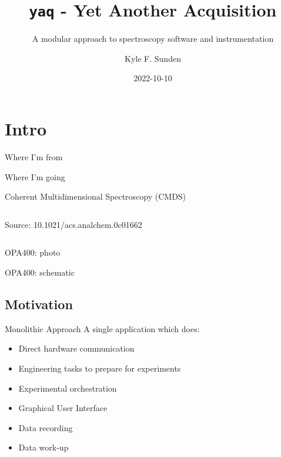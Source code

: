 \documentclass{presentation}
\title{\texttt{yaq} - Yet Another Acquisition}
\subtitle{A modular approach to spectroscopy software and instrumentation}
\author{Kyle F. Sunden}
\institute{University of Wisconsin--Madison}
\date{2022-10-10}
\begin{document}
\maketitle
\section{Intro}
\begin{frame}{Where I'm from}
\end{frame}
\begin{frame}{Where I'm going}
\end{frame}
\begin{frame}{Coherent Multidimensional Spectroscopy (CMDS)}
	\begin{columns}
		\begin{column}{0.48\textwidth}
			Source: 10.1021/acs.analchem.0c01662
		\end{column}
		\begin{column}{0.48\textwidth}
		\end{column}
	\end{columns}
\end{frame}

\begin{frame}{OPA400: photo}
\end{frame}
\begin{frame}{OPA400: schematic}
\end{frame}

\subsection{Motivation}
\begin{frame}{Monolithic Approach}
	A single application which does:
	\begin{itemize}
		\item Direct hardware communication
		\item Engineering tasks to prepare for experiments
		\item Experimental orchestration
		\item Graphical User Interface
		\item Data recording
		\item Data work-up
	\end{itemize}
\end{frame}
\end{document}
